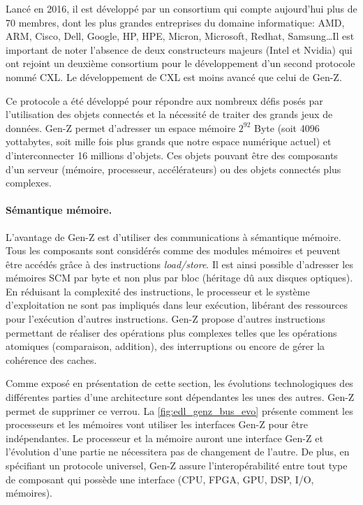         
        Lancé en 2016, il est développé par un consortium qui compte aujourd'hui plus de 70 membres, dont les plus grandes entreprises du domaine informatique: AMD, ARM, Cisco, Dell, Google, HP, HPE, Micron, Microsoft, Redhat, Samsung\ldots Il est important de noter l'absence de deux constructeurs majeurs (Intel et Nvidia) qui ont rejoint un deuxième consortium pour le développement d'un second protocole nommé CXL. Le développement de CXL est moins avancé que celui de Gen-Z.
        
        Ce protocole a été développé pour répondre aux nombreux défis posés par l'utilisation des objets connectés et la nécessité de traiter des grands jeux de données. Gen-Z permet d'adresser un espace mémoire $2^{92}$ Byte (soit 4096 yottabytes, soit mille fois plus grands que notre espace numérique actuel) et d’interconnecter 16 millions d'objets. Ces objets pouvant être des composants d'un serveur (mémoire, processeur, accélérateurs) ou des objets connectés plus complexes.
            
    

        \paragraph{Sémantique mémoire.} 
            L'avantage de Gen-Z est d'utiliser des communications à sémantique mémoire. Tous les composants sont considérés comme des modules mémoires et peuvent être accédés grâce à des instructions \textit{load/store}. Il est ainsi possible d'adresser les mémoires SCM par byte et non plus par bloc (héritage dû aux disques optiques). En réduisant la complexité des instructions, le processeur et le système d'exploitation ne sont pas impliqués dans leur exécution, libérant des ressources pour l'exécution d'autres instructions. Gen-Z propose d'autres instructions permettant de réaliser des opérations plus complexes telles que les opérations atomiques (comparaison, addition), des interruptions ou encore de gérer la cohérence des caches.
        
            Comme exposé en présentation de cette section, les évolutions technologiques des différentes parties d'une architecture sont dépendantes les unes des autres. Gen-Z permet de supprimer ce verrou. La \autoref{fig:edl_genz_bus_evo} présente comment les processeurs et les mémoires vont utiliser les interfaces Gen-Z pour être indépendantes. Le processeur et la mémoire auront une interface Gen-Z et l'évolution d'une partie ne nécessitera pas de changement de l'autre. De plus, en spécifiant un protocole universel, Gen-Z assure l'interopérabilité entre tout type de composant qui possède une interface (CPU, FPGA, GPU, DSP, I/O, mémoires).

